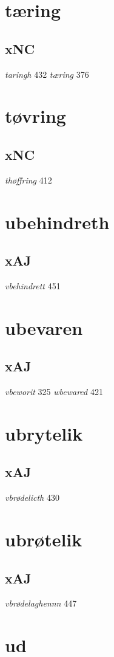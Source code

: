 \documentclass[a4paper,twocolumn]{article}
\begin{document}
\section{tæring}
\label{sec:org7731e1c}
\subsection{xNC}
\label{sec:org8ee1181}
\emph{taringh} 432 \emph{tæring} 376 
\section{tøvring}
\label{sec:org02ce1dc}
\subsection{xNC}
\label{sec:orgbd26cb5}
\emph{thøffring} 412 
\section{ubehindreth}
\label{sec:org1cab8fd}
\subsection{xAJ}
\label{sec:org0f99565}
\emph{vbehindrett} 451 
\section{ubevaren}
\label{sec:org1fe05cd}
\subsection{xAJ}
\label{sec:org6c95d99}
\emph{vbeworit} 325 \emph{wbewared} 421 
\section{ubrytelik}
\label{sec:org77f410f}
\subsection{xAJ}
\label{sec:orgd88f09d}
\emph{vbrødelicth} 430 
\section{ubrøtelik}
\label{sec:org221d89c}
\subsection{xAJ}
\label{sec:orgef4d677}
\emph{vbrødelaghennn} 447 
\section{ud}
\label{sec:org754fcc1}
\end{document}
